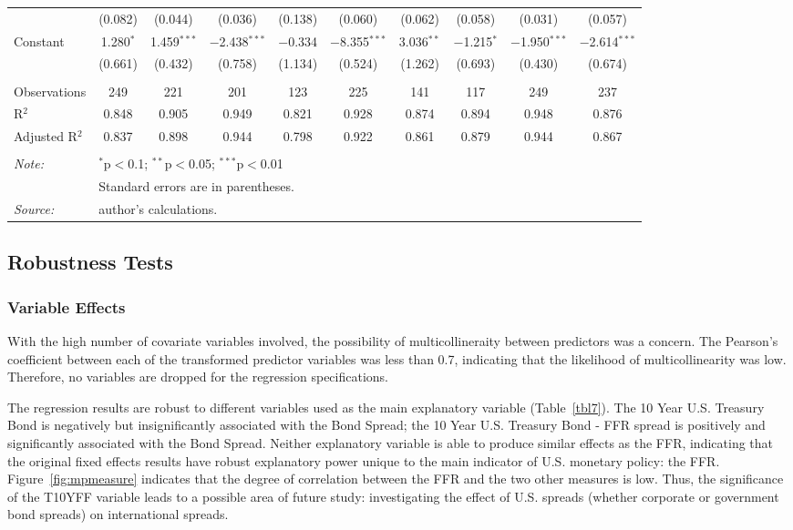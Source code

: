 \documentclass[12pt]{article}
\begin{document}
\begin{landscape}
\begin{table}[!htbp]
\begin{tabular}{@{\extracolsep{5pt}}lccccccccc}
  & (0.082) & (0.044) & (0.036) & (0.138) & (0.060) & (0.062) & (0.058) & (0.031) & (0.057) \\ 
  Constant & 1.280$^{*}$ & 1.459$^{***}$ & $-$2.438$^{***}$ & $-$0.334 & $-$8.355$^{***}$ & 3.036$^{**}$ & $-$1.215$^{*}$ & $-$1.950$^{***}$ & $-$2.614$^{***}$ \\ 
  & (0.661) & (0.432) & (0.758) & (1.134) & (0.524) & (1.262) & (0.693) & (0.430) & (0.674) \\ 
 \hline \\[-1.8ex] 
Observations & 249 & 221 & 201 & 123 & 225 & 141 & 117 & 249 & 237 \\ 
R$^{2}$ & 0.848 & 0.905 & 0.949 & 0.821 & 0.928 & 0.874 & 0.894 & 0.948 & 0.876 \\ 
Adjusted R$^{2}$ & 0.837 & 0.898 & 0.944 & 0.798 & 0.922 & 0.861 & 0.879 & 0.944 & 0.867 \\ 
\hline 
\hline \\[-1.8ex] 
\textit{Note:}  & \multicolumn{9}{l}{$^{*}$p$<$0.1; $^{**}$p$<$0.05; $^{***}$p$<$0.01} \\ 
 & \multicolumn{7}{l}{Standard errors are in parentheses.} \\
 \textit{Source:}  & \multicolumn{7}{l}{author's calculations.} \\  
\end{tabular} 
\end{table} 
\end{landscape}

%
\subsection{Robustness Tests}
\subsubsection{Variable Effects}
With the high number of covariate variables involved, the possibility of multicollineraity between predictors was a concern. The Pearson's coefficient between each of the transformed predictor variables was less than 0.7, indicating that the likelihood of multicollinearity was low. Therefore, no variables are dropped for the regression specifications.

The regression results are robust to different variables used as the main explanatory variable (Table~\ref{tbl7}). The 10 Year U.S. Treasury Bond is negatively but insignificantly associated with the Bond Spread; the 10 Year U.S. Treasury Bond - FFR spread is positively and significantly associated with the Bond Spread. Neither explanatory variable is able to produce similar effects as the FFR, indicating that the original fixed effects results have robust explanatory power unique to the main indicator of U.S. monetary policy: the FFR. Figure~\ref{fig:mpmeasure} indicates that the degree of correlation between the FFR and the two other measures is low. Thus, the significance of the T10YFF variable leads to a possible area of future study: investigating the effect of U.S. spreads (whether corporate or government bond spreads) on international spreads.
%
%
\end{document}
